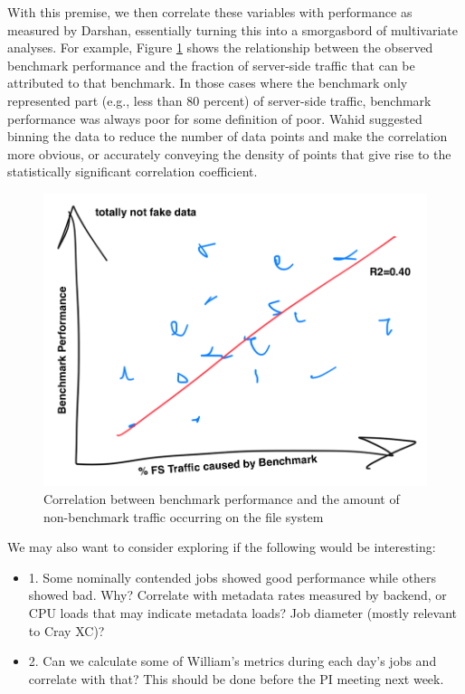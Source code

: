 \documentclass[conference,10pt,compsocconf]{IEEEtran}
\begin{document}
With this premise, we then correlate these variables with performance as
measured by Darshan, essentially turning this into a smorgasbord of
multivariate analyses.  For example, Figure \ref{fig:correlate-perf-and-fstraffic}
shows the relationship between the observed benchmark performance and the
fraction of server-side traffic that can be attributed to that benchmark.
In those cases where the benchmark only represented part (e.g., less than 80
percent) of server-side traffic, benchmark performance was always poor for
some definition of poor.  Wahid suggested binning the data to reduce the
number of data points and make the correlation more obvious, or accurately
conveying the density of points that give rise to the statistically significant
correlation coefficient.

\begin{figure}[t]
\centering
\includegraphics[width=0.8\columnwidth]{figs/edison-perf-vs-fstraffic.png}
\caption{Correlation between benchmark performance and the amount of
non-benchmark traffic occurring on the file system}
\label{fig:correlate-perf-and-fstraffic}
\vspace{-.1in}
\end{figure}



We may also want to consider exploring if the following would be interesting:

\begin{itemize}
\item 1. Some nominally contended jobs showed good performance while others showed bad.  Why?  Correlate with metadata rates measured by backend, or CPU loads that may indicate metadata loads?  Job diameter (mostly relevant to Cray XC)?
\item 2. Can we calculate some of William's metrics during each day's jobs and correlate with that?  This should be done before the PI meeting next week.
\end{itemize}
\end{document}
